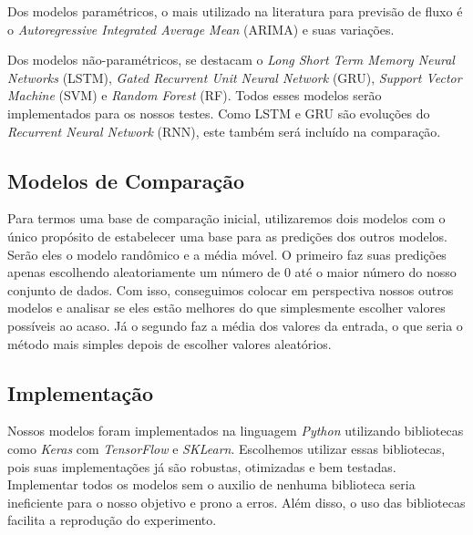 
Dos modelos paramétricos, o mais utilizado na literatura para previsão de fluxo é o \textit{Autoregressive Integrated Average Mean} (ARIMA) e suas variações. %

Dos modelos não-paramétricos, se destacam o \textit{Long Short Term Memory Neural Networks} (LSTM), \textit{Gated Recurrent Unit Neural Network} (GRU), \textit{Support Vector Machine} (SVM) e \textit{Random Forest} (RF). Todos esses modelos serão implementados para os nossos testes. Como LSTM e GRU são evoluções do \textit{Recurrent Neural Network} (RNN), este também será incluído na comparação. 

\subsection{Modelos de Comparação}

Para termos uma base de comparação inicial, utilizaremos dois modelos com o único propósito de estabelecer uma base para as predições dos outros modelos. Serão eles o modelo randômico e a média móvel. O primeiro faz suas predições apenas escolhendo aleatoriamente um número de 0 até o maior número do nosso conjunto de dados. Com isso, conseguimos colocar em perspectiva nossos outros modelos e analisar se eles estão melhores do que simplesmente escolher valores possíveis ao acaso. Já o segundo faz a média dos valores da entrada, o que seria o método mais simples depois de escolher valores aleatórios.
\subsection{Implementação}


Nossos modelos foram implementados na linguagem \textit{Python} utilizando bibliotecas como \textit{Keras} com \textit{TensorFlow} e \textit{SKLearn}. Escolhemos utilizar essas bibliotecas, pois suas implementações já são robustas, otimizadas e bem testadas. Implementar todos os modelos sem o auxilio de nenhuma biblioteca seria ineficiente para o nosso objetivo e prono a erros. Além disso, o uso das bibliotecas facilita a reprodução do experimento.

